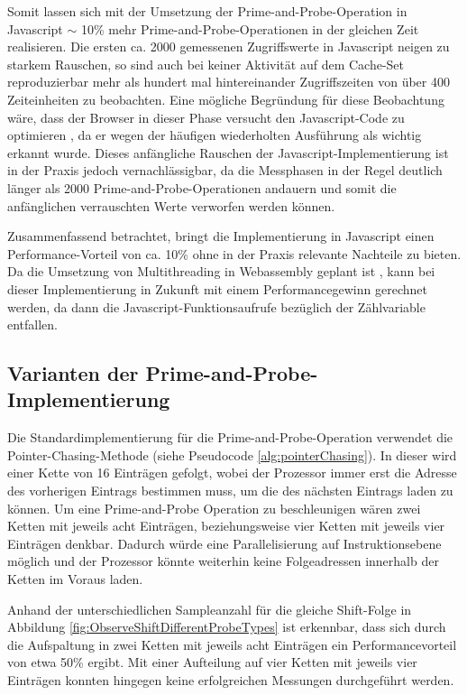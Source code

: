 Somit lassen sich mit der Umsetzung der Prime-and-Probe-Operation in Javascript $\sim$ 10\% mehr Prime-and-Probe-Operationen in der gleichen Zeit realisieren.
Die ersten ca. 2000 gemessenen Zugriffswerte in Javascript neigen zu starkem Rauschen, so sind auch bei keiner Aktivität auf dem Cache-Set reproduzierbar mehr als hundert mal hintereinander Zugriffszeiten von über 400 Zeiteinheiten zu beobachten.
Eine mögliche Begründung für diese Beobachtung wäre, dass der Browser in dieser Phase versucht den Javascript-Code zu optimieren \cite{GoogleTurboFan}, da er wegen der häufigen wiederholten Ausführung als wichtig erkannt wurde.
Dieses anfängliche Rauschen der Javascript-Implementierung ist in der Praxis jedoch vernachlässigbar, da die Messphasen in der Regel deutlich länger als 2000 Prime-and-Probe-Operationen andauern und somit die anfänglichen verrauschten Werte verworfen werden können.

Zusammenfassend betrachtet, bringt die Implementierung in Javascript einen Performance-Vorteil von ca. 10\% ohne in der Praxis relevante Nachteile zu bieten.
Da die Umsetzung von Multithreading in Webassembly geplant ist \cite{WebassemblyThreads}, kann bei dieser Implementierung in Zukunft mit einem Performancegewinn gerechnet werden, da dann die Javascript-Funktionsaufrufe bezüglich der Zählvariable entfallen.

\subsection{Varianten der Prime-and-Probe-Implementierung}
\label{SplitProbeType}

Die Standardimplementierung für die Prime-and-Probe-Operation verwendet die Pointer-Chasing-Methode (siehe Pseudocode \ref{alg:pointerChasing}). 
In dieser wird einer Kette von 16 Einträgen gefolgt, wobei der Prozessor immer erst die Adresse des vorherigen Eintrags bestimmen muss, um die des nächsten Eintrags laden zu können.
Um eine Prime-and-Probe Operation zu beschleunigen wären zwei Ketten mit jeweils acht Einträgen, beziehungsweise vier Ketten mit jeweils vier Einträgen denkbar.
Dadurch würde eine Parallelisierung auf Instruktionsebene möglich und der Prozessor könnte weiterhin keine Folgeadressen innerhalb der Ketten im Voraus laden.

Anhand der unterschiedlichen Sampleanzahl für die gleiche Shift-Folge in Abbildung \ref{fig:ObserveShiftDifferentProbeTypes} ist erkennbar, dass sich durch die Aufspaltung in zwei Ketten mit jeweils acht Einträgen ein Performancevorteil von etwa 50\% ergibt.
Mit einer Aufteilung auf vier Ketten mit jeweils vier Einträgen konnten hingegen keine erfolgreichen Messungen durchgeführt werden.

